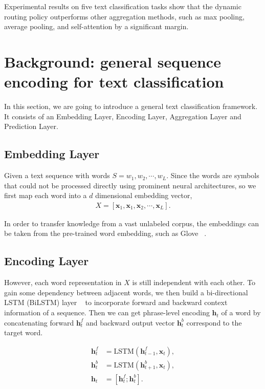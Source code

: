 \documentclass[11pt]{article}
\def\x{\mathbf{x}}
\def\bh{\mathbf{h}}
\def\bh{\mathbf{h}}
\begin{document}
Experimental results on five text classification tasks show that the dynamic routing policy outperforms other aggregation methods, such as max pooling, average pooling, and self-attention by a significant margin.

\section{Background: general sequence encoding for text classification}



In this section, we are going to introduce a general text classification framework. It consists of an Embedding Layer, Encoding Layer, Aggregation Layer and Prediction Layer.

\subsection{Embedding Layer}
Given a text sequence with words $S=w_1,w_2,\cdots,w_L$. Since the words are symbols that could not be processed directly using prominent neural architectures, so we first map each word into a $d$ dimensional embedding vector,
\begin{align}
	X = [\x_1,\x_1,\x_2,\cdots,\x_L].
\end{align}

In order to transfer knowledge from a vast unlabeled corpus, the embeddings can be taken from the pre-trained word embedding, such as Glove ~\cite{pennington2014glove}.

\subsection{Encoding Layer}
However, each word representation in $X$ is still independent with each other. To gain some dependency between adjacent words, we then build a bi-directional LSTM (BiLSTM) layer ~\cite{hochreiter1997long} to incorporate forward and backward context information of a sequence. Then we can get phrase-level encoding $\bh_t$ of a word by concatenating forward $\bh_t^f$ and backward output vector $\bh_t^b$ correspond to the target word.

\begin{align}
	\bh_t^f &= \text{LSTM}(\bh^f_{t-1}, \x_t),\\
	\bh_t^b &= \text{LSTM}(\bh^b_{t+1}, \x_t),\\
	\bh_t &= [\bh_t^f; \bh_t^b].
\end{align}
\end{document}
